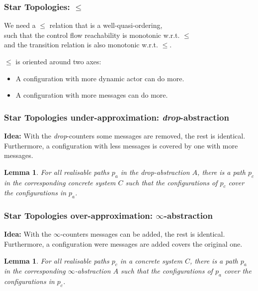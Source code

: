 \documentclass{beamer}
\newtheorem{lem}[thm]{Lemma}
\theoremstyle{remark}
\theoremstyle{definition}
\newcommand{\dabs}{\emph{drop}-abstraction}
\newcommand{\iabs}{$\infty$-abstraction}
\begin{document}
\begin{frame}
\frametitle{Star Topologies: $\leq$}
We need a $\leq$ relation that is a well-quasi-ordering,\\
such that the control flow reachability is monotonic w.r.t. $\leq$\\
and the transition relation is also monotonic w.r.t. $\leq$.

\vspace{10pt}

$\leq$ is oriented around two axes:
\begin{itemize}
\item A configuration with more dynamic actor can do more.
\item A configuration with more messages can do more.
\end{itemize}


\end{frame}

\begin{frame}
\frametitle{Star Topologies under-approximation: \dabs{}}

\textbf{Idea:}
With the \emph{drop}-counters some messages are removed, the rest is identical.
Furthermore, a configuration with less messages is covered by one with more messages.

\vspace{10pt}

\begin{lem}
\label{lemUnderApprox}
For all realisable paths $p_a$ in the \dabs{} $A$, there is a path $p_c$ in the corresponding concrete system $C$ such that the configurations of $p_c$ cover the configurations in $p_a$.
\end{lem}
\end{frame}

\begin{frame}
\frametitle{Star Topologies over-approximation: \iabs{}}

\textbf{Idea:}
With the $\infty$-counters messages can be added, the rest is identical.
Furthermore, a configuration were messages are added covers the original one.

\vspace{10pt}

\begin{lem}
\label{lemOverApprox}
For all realisable paths $p_c$ in a concrete system $C$, there is a path $p_a$ in the corresponding \iabs{} $A$ such that the configurations of $p_a$ cover the configurations in $p_c$.
\end{lem}
\end{frame}
\end{document}
